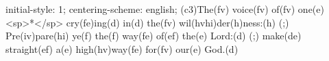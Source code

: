 initial-style: 1;
centering-scheme: english;
(c3)The(fv) voice(fv) of(fv) one(e) <sp>*</sp> cry(fe)ing(d) in(d) the(fv) wil(hvhi)der(h)ness:(h) (;) Pre(iv)pare(hi) ye(f) the(f) way(fe) of(ef) the(e) Lord:(d) (;) make(de) straight(ef) a(e) high(hv)way(fe) for(fv) our(e) God.(d)
